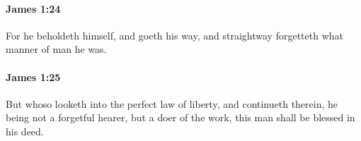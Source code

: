 		\paragraph{James 1:24} %
			\label{JAMES-1-24}

			For he beholdeth himself, and goeth his way, and straightway forgetteth what manner of man he was.

			\begin{framed}
			\scriptsize
				\begin{compactdesc}
					\item[SBLG] 
				\end{compactdesc}
			\end{framed}

		\paragraph{James 1:25} %
			\label{JAMES-1-25}

			But whoso looketh into the perfect law of liberty, and continueth therein, he being not a forgetful hearer, but a doer of the work, this man shall be blessed in his deed.

